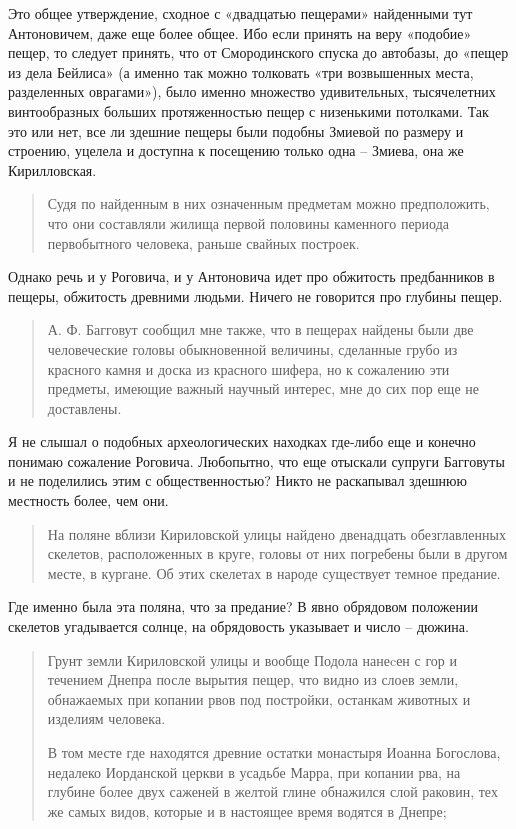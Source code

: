 Это общее утверждение, сходное с «двадцатью пещерами» найденными тут Антоновичем, даже еще более общее. Ибо если принять на веру «подобие» пещер, то следует принять, что от Смородинского спуска до автобазы, до «пещер из дела Бейлиса» (а именно так можно толковать «три возвышенных места, разделенных оврагами»), было именно множество удивительных, тысячелетних винтообразных больших протяженностью пещер с низенькими потолками. Так это или нет, все ли здешние пещеры были подобны Змиевой по размеру и строению, уцелела и доступна к посещению только одна – Змиева, она же Кирилловская.

\begin{quotation}
Судя по найденным в них означенным предметам можно предположить, что они составляли жилища первой половины каменного периода первобытного человека, раньше свайных построек.
\end{quotation}

Однако речь и у Роговича, и у Антоновича идет про обжитость предбанников в пещеры, обжитость древними людьми. Ничего не говорится про глубины пещер.

\begin{quotation}
А. Ф. Багговут сообщил мне также, что в пещерах найдены были две человеческие головы обыкновенной величины, сделанные грубо из красного камня и доска из красного шифера, но к сожалению эти предметы, имеющие важный научный интерес, мне до сих пор еще не доставлены.
\end{quotation}

Я не слышал о подобных археологических находках где-либо еще и конечно понимаю сожаление Роговича. Любопытно, что еще отыскали супруги Багговуты и не поделились этим с общественностью? Никто не раскапывал здешнюю местность более, чем они.

\begin{quotation}
На поляне вблизи Кириловской улицы найдено двенадцать обезглавленных скелетов, расположенных в круге, головы от них погребены были в другом месте, в кургане. Об этих скелетах в народе существует темное предание.
\end{quotation}

Где именно была эта поляна, что за предание? В явно обрядовом положении скелетов угадывается солнце, на обрядовость указывает и число – дюжина. 

\begin{quotation}
Грунт земли Кириловской улицы и вообще Подола нанеcен с гор и течением Днепра после вырытия пещер, что видно из слоев земли, обнажаемых при копании рвов под постройки, останкам животных и изделиям человека.

В том месте где находятся древние остатки монастыря Иоанна Богослова, недалеко Иорданской церкви в усадьбе Марра, при копании рва, на глубине более двух саженей в желтой глине обнажился слой раковин, тех же самых видов, которые и в настоящее время водятся в Днепре;
\end{quotation}

